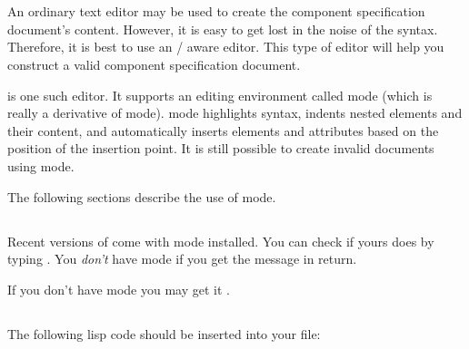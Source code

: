 \documentclass[11pt]{article}
\begin{document}
\section{\SECediting}
\label{\SECediting}

An ordinary text editor may be used to create the component specification
document's content.  However, it is easy to get lost in the noise of the
\xml{} syntax.  Therefore, it is best to use an \xml{}/\dtd{} aware editor.
This type of editor will help you construct a valid component specification
document.

\Emacs{} is one such editor.  It supports an editing environment called
\xml{} mode (which is really a derivative of \psgml{} mode).  \Xml{} mode
highlights \xml{} syntax, indents nested elements and their content, and
automatically inserts elements and attributes based on the position of the
insertion point.  It is still possible to create invalid documents using
\emacs{} \xml{} mode.

The following sections describe the use of \emacs{} \xml{} mode.

\subsection{\SUBSECgettingSources}
\label{\SUBSECgettingSources}

Recent versions of \emacs{} come with \xml{} mode installed.  You can check
if yours does by typing .  You \emph{don't} have
\xml{} mode if you get the message
\screen{[No match]} in return.

If you don't have \xml{} mode you may get it
.

\subsection{\SUBSECdotEmacs}
\label{\SUBSECdotEmacs}

The following lisp code should be inserted into your 
file:
\end{document}
